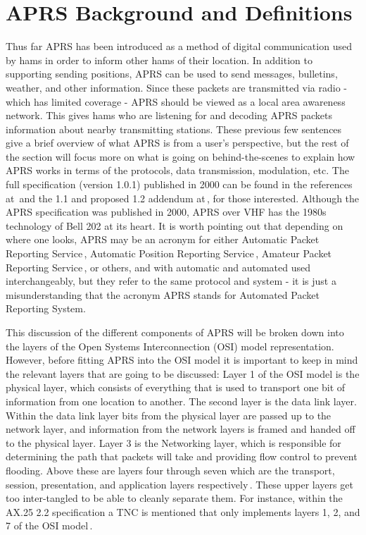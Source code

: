 \chapter{APRS Background and Definitions}
Thus far APRS has been introduced as a method of digital communication used by hams in order to inform other hams of their location. In addition to supporting sending positions, APRS can be used to send messages, bulletins, weather, and other information. Since these packets are transmitted via radio  - which has limited coverage - APRS should be viewed as a local area awareness network. This gives hams who are listening for and decoding APRS packets information about nearby transmitting stations. These previous few sentences give a brief overview of what APRS is from a user's perspective, but the rest of the section will focus more on what is going on behind-the-scenes to explain how APRS works in terms of the protocols, data transmission, modulation, etc. The full specification (version 1.0.1) published in 2000 can be found in the references at\,\cite{Group2000} and the 1.1 and proposed 1.2 addendum at\,\cite{Bruninga2004,Bruninga2013}, for those interested. Although the APRS specification was published in 2000, APRS over VHF has the 1980s technology of Bell 202 at its heart. It is worth pointing out that depending on where one looks, APRS may be an acronym for either Automatic Packet Reporting Service\,\cite{Bruninga}, Automatic Position Reporting Service\,\cite{Smith2012}, Amateur Packet Reporting Service\,\cite{Holder2012}, or others, and with automatic and automated used interchangeably, but they refer to the same protocol and system - it is just a misunderstanding that the acronym APRS stands for Automated Packet Reporting System.

This discussion of the different components of APRS will be broken down into the layers of the Open Systems Interconnection (OSI) model representation. However, before fitting APRS into the OSI model it is important to keep in mind the relevant layers that are going to be discussed: Layer 1 of the OSI model is the physical layer, which consists of everything that is used to transport one bit of information from one location to another. The second layer is the data link layer. Within the data link layer bits from the physical layer are passed up to the network layer, and information from the network layers is framed and handed off to the physical layer. Layer 3 is the Networking layer, which is responsible for determining the path that packets will take and providing flow control to prevent flooding. Above these are layers four through seven which are the transport, session, presentation, and application layers respectively\,\cite{Sosinsky2009}. These upper layers get too inter-tangled to be able to cleanly separate them. For instance, within the AX.25 2.2 specification a TNC is mentioned that only implements layers 1, 2, and 7 of the OSI model\,\cite{Beech1998}.

